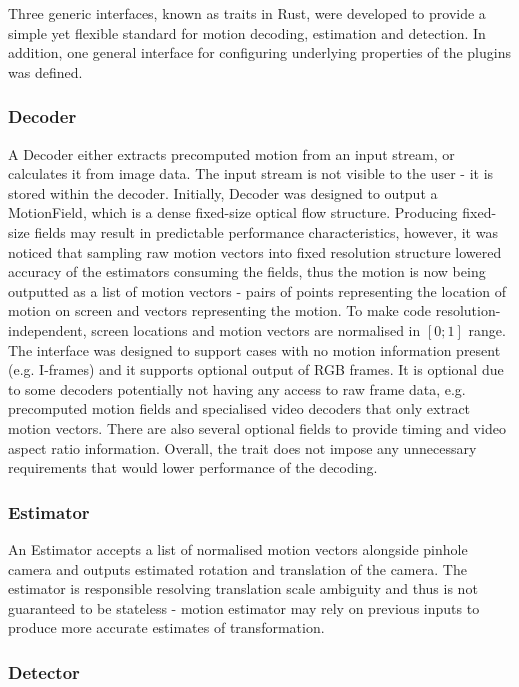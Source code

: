 \documentclass[11pt,english]{report}
\begin{document}
Three generic interfaces, known as traits in Rust, were developed to provide a simple yet flexible standard for motion decoding, estimation and detection. In addition, one general interface for configuring underlying properties of the plugins was defined.

\subsubsection{Decoder}

A Decoder either extracts precomputed motion from an input stream, or calculates it from image data. The input stream is not visible to the user - it is stored within the decoder. Initially, Decoder was designed to output a MotionField, which is a dense fixed-size optical flow structure. Producing fixed-size fields may result in predictable performance characteristics, however, it was noticed that sampling raw motion vectors into fixed resolution structure lowered accuracy of the estimators consuming the fields, thus the motion is now being outputted as a list of motion vectors - pairs of points representing the location of motion on screen and vectors representing the motion. To make code resolution-independent, screen locations and motion vectors are normalised in $[0; 1]$ range. The interface was designed to support cases with no motion information present (e.g. I-frames) and it supports optional output of RGB frames. It is optional due to some decoders potentially not having any access to raw frame data, e.g. precomputed motion fields and specialised video decoders that only extract motion vectors. There are also several optional fields to provide timing and video aspect ratio information. Overall, the trait does not impose any unnecessary requirements that would lower performance of the decoding.

\subsubsection{Estimator}

An Estimator accepts a list of normalised motion vectors alongside pinhole camera and outputs estimated rotation and translation of the camera. The estimator is responsible resolving translation scale ambiguity and thus is not guaranteed to be stateless - motion estimator may rely on previous inputs to produce more accurate estimates of transformation.

\subsubsection{Detector}
\end{document}

